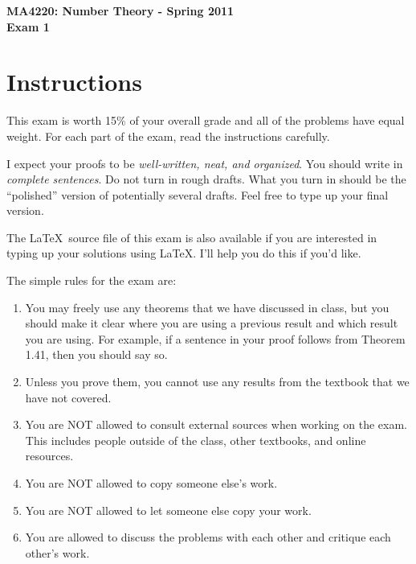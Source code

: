 \documentclass[11pt]{article}
\theoremstyle{definition}
\begin{document}
\begin{center}

{\Large\bf MA4220: Number Theory - Spring 2011}\\
\smallskip
{\Large\bf Exam 1}

\bigskip


\end{center}

\setlength{\fboxsep}{10pt}

\section*{Instructions}

This exam is worth 15\% of your overall grade and all of the problems have equal weight.  For each part of the exam, read the instructions carefully.

\bigskip

I expect your proofs to be \emph{well-written, neat, and organized}.  You should write in \emph{complete sentences}.  Do not turn in rough drafts.  What you turn in should be the ``polished'' version of potentially several drafts.  Feel free to type up your final version.  

\bigskip

The \LaTeX\ source file of this exam is also available if you are interested in typing up your solutions using \LaTeX.  I'll help you do this if you'd like.

\bigskip

The simple rules for the exam are:

\begin{enumerate}
\item You may freely use any theorems that we have discussed in class, but you should make it clear where you are using a previous result and which result you are using.  For example, if a sentence in your proof follows from Theorem 1.41, then you should say so.
\item Unless you prove them, you cannot use any results from the textbook that we have not covered.
\item You are NOT allowed to consult external sources when working on the exam.  This includes people outside of the class, other textbooks, and online resources.
\item You are NOT allowed to copy someone else's work.
\item You are NOT allowed to let someone else copy your work.
\item You are allowed to discuss the problems with each other and critique each other's work.
\end{enumerate}
\end{document}
